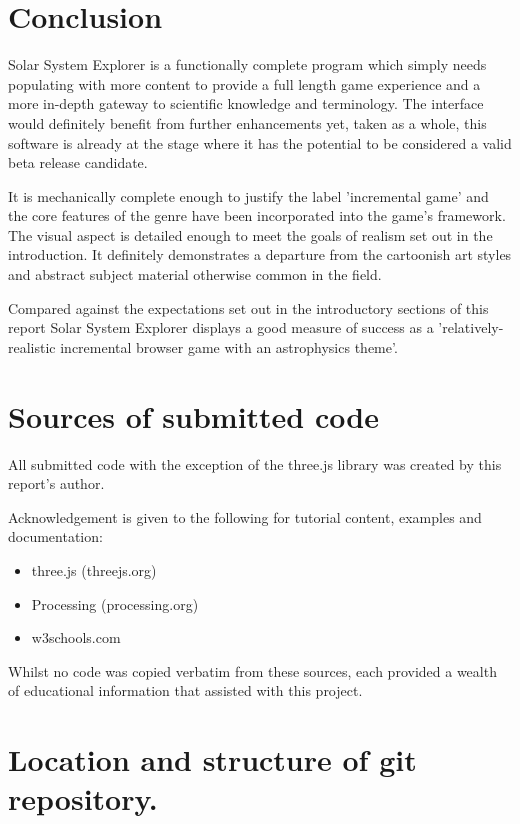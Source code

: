 \documentclass[twoside]{bhamthesis}
\begin{document}
\newpage
\section{Conclusion}

Solar System Explorer is a functionally complete program which simply needs populating with more content to provide a full length game experience and a more in-depth gateway to scientific knowledge and terminology. The interface would definitely benefit from further enhancements yet, taken as a whole, this software is already at the stage where it has the potential to be considered a valid beta release candidate.

It is mechanically complete enough to justify the label 'incremental game' and the core features of the genre have been incorporated into the game's framework. The visual aspect is detailed enough to meet the goals of realism set out in the introduction. It definitely demonstrates a departure from the cartoonish art styles and abstract subject material otherwise common in the field.

Compared against the expectations set out in the introductory sections of this report Solar System Explorer displays a good measure of success as a 'relatively-realistic incremental browser game with an astrophysics theme'.

\section{Sources of submitted code}
All submitted code with the exception of the three.js library was created by this report's author.

\noindent
Acknowledgement is given to the following for tutorial content, examples and documentation:
\begin{itemize}
\item three.js (threejs.org)
\item Processing (processing.org)
\item w3schools.com
\end{itemize}
Whilst no code was copied verbatim from these sources, each provided a wealth of educational information that assisted with this project.

\printbibliography

\appendix
\appendixpage
\addappheadtotoc

\section{Location and structure of git repository.}
\end{document}
